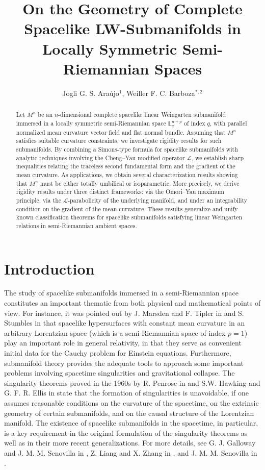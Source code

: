 \documentclass[leqno,11pt]{amsart}
\title[On the Geometry of Complete Spacelike LW-Submanifolds in $\mathbb{L}_{q}^{n+p}$]{On the Geometry of Complete Spacelike LW-Submanifolds in Locally Symmetric Semi-Riemannian Spaces}
\author[Ara\'{u}jo, J.G.S. And Barboza, W.F.C]{Jogli G. S. Ara\'{u}jo$^1$, Weiller F. C. Barboza$^{*,2}$}
\theoremstyle{plain}
\theoremstyle{definition}
\numberwithin{equation}{section}
\begin{document}
\begin{abstract}
Let $M^{n}$ be an $n$-dimensional complete spacelike linear Weingarten submanifold immersed in a locally symmetric semi-Riemannian space $\mathbb{L}_{q}^{n+p}$ of index $q$, with parallel normalized mean curvature vector field and flat normal bundle. Assuming that $M^{n}$ satisfies suitable curvature constraints, we investigate rigidity results for such submanifolds. By combining a Simons-type formula for spacelike submanifolds with analytic techniques involving the Cheng--Yau modified operator $\mathcal{L}$, we establish sharp inequalities relating the traceless second fundamental form and the gradient of the mean curvature. As applications, we obtain several characterization results showing that $M^{n}$ must be either totally umbilical or isoparametric. More precisely, we derive rigidity results under three distinct frameworks: via the Omori--Yau maximum principle, via the $\mathcal{L}$-parabolicity of the underlying manifold, and under an integrability condition on the gradient of the mean curvature. These results generalize and unify known classification theorems for spacelike submanifolds satisfying linear Weingarten relations in semi-Riemannian ambient spaces.
\end{abstract}


\maketitle

\tableofcontents

\section{Introduction}

The study of spacelike submanifolds immersed in a semi-Riemannian space constitutes an important thematic from both physical and mathematical points of view. For instance, it was pointed out by J. Marsden and F. Tipler in \cite{Marsden:78} and S. Stumbles in \cite{Stumbles:80} that spacelike hypersurfaces with constant mean curvature in an arbitrary Lorentzian space (which is a semi-Riemannian space of index $p = 1$) play an important role in general relativity, in that they serve as convenient initial data for the Cauchy problem for Einstein equations. Furthermore, submanifold theory provides the adequate tools to approach some important problems involving spacetime singularities and gravitational collapse. The singularity theorems proved in the 1960s by R. Penrose in \cite{Penrose:1965} and S.W. Hawking and G. F. R. Ellis in \cite{Hawking-Ellis:1973} state that the formation of singularities is unavoidable, if one assumes reasonable conditions on the curvature of the spacetime, on the extrinsic geometry of certain submanifolds, and on the causal structure of the Lorentzian manifold. The existence of spacelike submanifolds in the spacetime, in particular, is a key requirement in the original formulation of the singularity theorems as well as in their more recent generalizations. For more details, see G. J. Galloway and J. M. M. Senovilla in \cite{Galloway-Senovilla:2010}, Z. Liang and X. Zhang in \cite{Liang-Zhang:2012}, and J. M. M. Senovilla in \cite{Senovilla:2012}.
\end{document}
